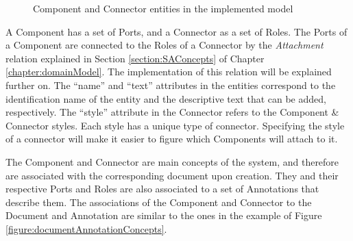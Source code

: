 \begin{figure}[h]
\centering
\renewcommand {\umltextcolor}{black}
\renewcommand {\umlfillcolor}{none}
\renewcommand {\umldrawcolor}{black}
\caption{Component and Connector entities in the implemented model}
\label{figure:modelComponentConnector}
\end{figure}
 
A Component has a set of Ports, and a Connector as a set of Roles. The Ports of a Component are connected to the Roles of a Connector by the \textit{Attachment} relation explained in Section \ref{section:SAConcepts} of Chapter \ref{chapter:domainModel}. The implementation of this relation will be explained further on. The ``name'' and ``text'' attributes in the entities correspond to the identification name of the entity and the descriptive text that can be added, respectively. The ``style'' attribute in the Connector refers to the Component \& Connector styles. Each style has a unique type of connector. Specifying the style of a connector will make it easier to figure which Components will attach to it.

The Component and Connector are main concepts of the system, and therefore are associated with the corresponding document upon creation. They and their respective Ports and Roles are also associated to a set of Annotations that describe them. The associations of the Component and Connector to the Document and Annotation are similar to the ones in the example of Figure \ref{figure:documentAnnotationConcepts}.

